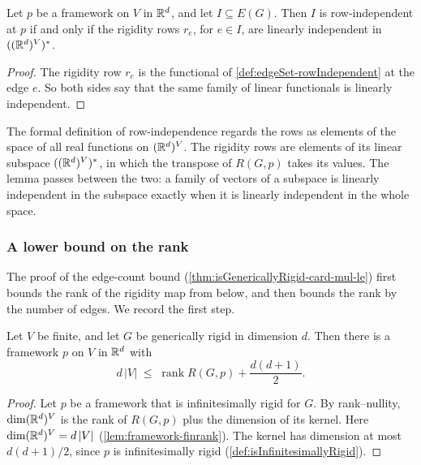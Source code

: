 \begin{lemma}
  \label{lem:edgeSetRowIndependent-iff-linearIndepOn-rigidityRow}
  \leanok
  Let $p$ be a framework on $V$ in ${\mathbb{R}}^{d}$, and let
  $I \subseteq E(G)$. Then $I$ is row-independent at $p$ if and only if
  the rigidity rows $r_e$, for $e \in I$, are linearly independent in
  $(({\mathbb{R}}^{d})^{V})^{*}$.
\end{lemma}
\begin{proof}
  \leanok
  The rigidity row $r_e$ is the functional of
  \cref{def:edgeSet-rowIndependent} at the edge $e$. So both sides say
  that the same family of linear functionals is linearly independent.
\end{proof}
\begin{fmlnote}
  The formal definition of row-independence regards the rows as
  elements of the space of all real functions on $({\mathbb{R}}^{d})^{V}$. The
  rigidity rows are elements of its linear subspace
  $(({\mathbb{R}}^{d})^{V})^{*}$, in which the transpose of $R(G, p)$ takes its
  values. The lemma passes between the two: a family of vectors of a
  subspace is linearly independent in the subspace exactly when it is
  linearly independent in the whole space.
\end{fmlnote}

\subsubsection{A lower bound on the rank}

The proof of the edge-count bound
(\cref{thm:isGenericallyRigid-card-mul-le}) first bounds the rank of
the rigidity map from below, and then bounds the rank by the number of
edges. We record the first step.

\begin{lemma}
  \label{lem:rigidityMap-finrank-range-ge-of-isGenericallyRigid}
  \leanok
  Let $V$ be finite, and let $G$ be generically rigid in dimension $d$.
  Then there is a framework $p$ on $V$ in ${\mathbb{R}}^{d}$ with
  \[
    d\,|V| \;\le\; \operatorname{rank} R(G, p) + \frac{d(d+1)}{2}.
  \]
\end{lemma}
\begin{proof}
  \leanok
  Let $p$ be a framework that is infinitesimally rigid for $G$. By
  rank--nullity, $\dim ({\mathbb{R}}^{d})^{V}$ is the rank of $R(G, p)$ plus the
  dimension of its kernel. Here $\dim ({\mathbb{R}}^{d})^{V} = d\,|V|$
  (\cref{lem:framework-finrank}). The kernel has dimension at most
  $d(d+1)/2$, since $p$ is infinitesimally rigid
  (\cref{def:isInfinitesimallyRigid}).
\end{proof}

